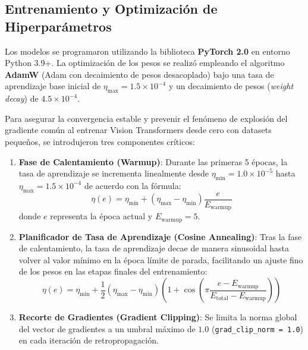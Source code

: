 \subsection{Entrenamiento y Optimización de Hiperparámetros}
Los modelos se programaron utilizando la biblioteca \textbf{PyTorch 2.0} en entorno Python 3.9+. La optimización de los pesos se realizó empleando el algoritmo \textbf{AdamW} (Adam con decaimiento de pesos desacoplado) bajo una tasa de aprendizaje base inicial de $\eta_{\text{max}} = 1.5 \times 10^{-4}$ y un decaimiento de pesos (\textit{weight decay}) de $4.5 \times 10^{-4}$.

Para asegurar la convergencia estable y prevenir el fenómeno de explosión del gradiente común al entrenar Vision Transformers desde cero con datasets pequeños, se introdujeron tres componentes críticos:
\begin{enumerate}
    \item \textbf{Fase de Calentamiento (Warmup)}: Durante las primeras 5 épocas, la tasa de aprendizaje se incrementa linealmente desde $\eta_{\text{min}} = 1.0 \times 10^{-5}$ hasta $\eta_{\text{max}} = 1.5 \times 10^{-4}$ de acuerdo con la fórmula:
    \begin{equation}
        \eta(e) = \eta_{\text{min}} + (\eta_{\text{max}} - \eta_{\text{min}}) \frac{e}{E_{\text{warmup}}}
    \end{equation}
    donde $e$ representa la época actual y $E_{\text{warmup}} = 5$.
    
    \item \textbf{Planificador de Tasa de Aprendizaje (Cosine Annealing)}: Tras la fase de calentamiento, la tasa de aprendizaje decae de manera sinusoidal hasta volver al valor mínimo en la época límite de parada, facilitando un ajuste fino de los pesos en las etapas finales del entrenamiento:
    \begin{equation}
        \eta(e) = \eta_{\text{min}} + \frac{1}{2}(\eta_{\text{max}} - \eta_{\text{min}})\left(1 + \cos\left(\pi \frac{e - E_{\text{warmup}}}{E_{\text{total}} - E_{\text{warmup}}}\right)\right)
    \end{equation}
    
    \item \textbf{Recorte de Gradientes (Gradient Clipping)}: Se limita la norma global del vector de gradientes a un umbral máximo de $1.0$ (\texttt{grad\_clip\_norm = 1.0}) en cada iteración de retropropagación.
\end{enumerate}

